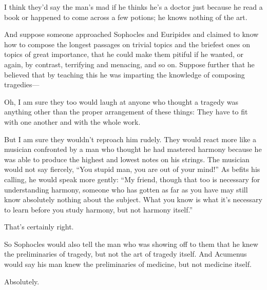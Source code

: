 \sayphaedrus I think they'd say the man's mad if he thinks he's a doctor
just because he read a book or happened to come across a few potions; he
knows nothing of the art.

\saysocrates And suppose someone approached Sophocles and Euripides and
claimed to know how to compose the longest passages on trivial topics
and the briefest ones on topics of great importance, that he could make
them pitiful if he wanted, or again, by contrast, terrifying and
menacing, and so on. Suppose further that he believed that by
teaching this he was imparting the knowledge of composing tragedies---

\sayphaedrus Oh, I am sure they too would laugh at anyone who thought a
tragedy was anything other than the proper arrangement of these things:
They have to fit with one another and with the whole work.

\saysocrates But I am sure they wouldn't reproach him rudely. They would
react more like a musician confronted by a man who thought he had
mastered harmony because he was able to produce the highest and lowest 
notes on his strings. The musician would not say fiercely, “You
stupid man, you are out of your mind!” As befits his calling, he would
speak more gently: “My friend, though that too is necessary for
understanding harmony, someone who has gotten as far as you have may
still know absolutely nothing about the subject. What you know is what
it's necessary to learn before you study harmony, but not harmony
itself.”

\sayphaedrus That's certainly right.

\saysocrates So Sophocles would also tell the man who was showing off 
to them that he knew the preliminaries of tragedy, but
not the art of tragedy itself. And Acumenus would say his man knew the
preliminaries of medicine, but not medicine itself.

\sayphaedrus Absolutely.

